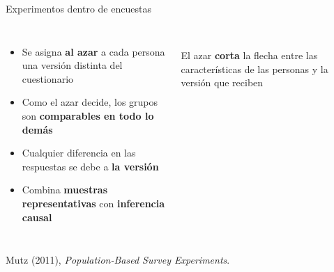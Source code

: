 \documentclass[aspectratio=169,11pt]{beamer}
\newcommand{\hl}[1]{\textcolor{marino}{\textbf{#1}}}        %
\newcommand{\fuente}[1]{\par\vfill{\scriptsize\color{gris}#1\par}}
\begin{document}
\begin{frame}{Experimentos dentro de encuestas}
\begin{columns}[c]
\begin{itemize}
  \item Se asigna \hl{al azar} a cada persona una versión distinta del cuestionario
  \item Como el azar decide, los grupos son \textbf{comparables en todo lo demás}
  \item Cualquier diferencia en las respuestas se debe a \textbf{la versión}
  \item Combina \textbf{muestras representativas} con \textbf{inferencia causal}
\end{itemize}
\centering
{}
\\[0.2cm]
\footnotesize El azar \textbf{corta} la flecha entre las características de las personas y la versión que reciben
\end{columns}
\fuente{Mutz (2011), \emph{Population-Based Survey Experiments}.}
\end{frame}
\end{document}
